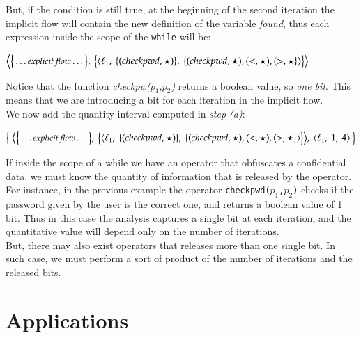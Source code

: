\documentclass{llncs}
\newcommand{\blangle}{\big\langle}
\newcommand{\brangle}{\big\rangle}
\begin{document}
\noindent But, if the condition is still true, at the beginning of the second iteration the implicit flow will contain the new definition of the variable \emph{found}, thus each expression inside the scope of the \texttt{while} will be:
\begin{center}
{\footnotesize$ \blangle \big\{\ldots \small\textit{explicit flow}\ldots\big\} ,\ \big\{\langle \ell_1,\ \{(checkpwd, \star)\},\ \{(checkpwd, \star), (<, \star), (>, \star\}\rangle\big\}\brangle $}
\end{center}
Notice that the function \emph{checkpw($p_1$,$p_2$)} returns a boolean value, so \emph{one bit}. This means that we are introducing a bit for each iteration in the implicit flow.\\ 

We now add the quantity interval computed in \emph{step (a)}:
\begin{center}

{\footnotesize $ \big\{\ \blangle \big\{\ldots \small\textit{explicit flow}\ldots\big\} ,\ \big\{\langle \ell_1,\ \{(checkpwd, \star)\},\ \{(checkpwd, \star), (<, \star), (>, \star\}\rangle\big\}\brangle,\ \langle \ell_1,\ 1,\ 4 \rangle\ \big\} $}
\end{center}



If inside the scope of a while we have an operator that obfuscates a confidential data, we must know the quantity of information that is released by the operator. For instance, in the previous example the operator \texttt{checkpwd($p_1$,$p_2$)} checks if the password given by the user is the correct one, and returns a boolean value of 1 bit. Thus in this case the analysis captures a single bit at each iteration, and the quantitative value will depend only on the number of iterations.\\
But, there may also exist operators that releases more than one single bit. In such case, we must perform a sort of product of the number of iterations and the released bits. 


 \section{Applications}
\end{document}

